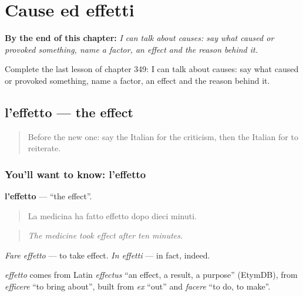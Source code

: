 
\chapter{Cause ed effetti}
\label{ch:it-cause-ed-effetti}

\begin{chapteropening}
\textbf{By the end of this chapter:} \emph{I can talk about causes: say what caused or provoked something, name a factor, an effect and the reason behind it.}

Complete the last lesson of chapter 349: I can talk about causes: say what caused or provoked something, name a factor, an effect and the reason behind it.
\end{chapteropening}

\section[l'effetto]{l'effetto — the effect}

\label{lesson:IT-C349-effetto}



\begin{quote}
Before the new one: say the Italian for the criticism, then the Italian for to reiterate.
\end{quote}

\subsection*{You'll want to know: l'effetto}
\textbf{l'effetto} — \textquotedblleft{}the effect\textquotedblright{}.

\begin{quote}
La medicina ha fatto effetto dopo dieci minuti.
\end{quote}

\begin{quote}
\emph{The medicine took effect after ten minutes.}
\end{quote}

\emph{Fare effetto} — to take effect. \emph{In effetti} — in fact, indeed.

\begin{cousinweb}
\emph{effetto} comes from Latin \emph{effectus} \textquotedblleft{}an effect, a result, a purpose\textquotedblright{} (EtymDB), from \emph{efficere} \textquotedblleft{}to bring about\textquotedblright{}, built from \emph{ex} \textquotedblleft{}out\textquotedblright{} and \emph{facere} \textquotedblleft{}to do, to make\textquotedblright{}.
\end{cousinweb}

